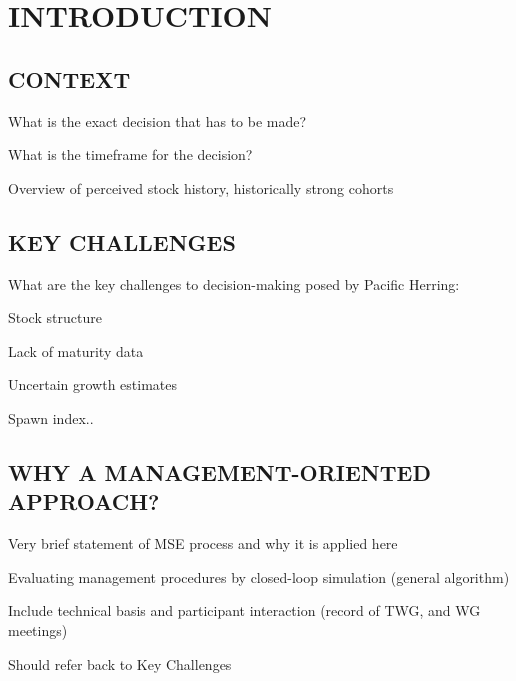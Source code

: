 \documentclass[11pt]{book}\usepackage[]{graphicx}\usepackage[]{color}
\begin{document}

\newcommand{\fishName}{Pacific Herring}
\newcommand{\scienceName}{\emph{Clupea pallasii}}

\frontmatter


\section{INTRODUCTION}

\subsection{CONTEXT}

\begin{resdoclist}
\item What is the exact decision that has to be made?
\item What is the timeframe for the decision?
\item Overview of perceived stock history, historically strong cohorts
\end{resdoclist}

\subsection{KEY CHALLENGES}

What are the key challenges to decision-making posed by \fishName{}:

\begin{resdoclist}
\item Stock structure
\item Lack of maturity data
\item Uncertain growth estimates
\item Spawn index..
\end{resdoclist}

\subsection{WHY A MANAGEMENT-ORIENTED APPROACH?}

\begin{resdoclist}
\item Very brief statement of MSE process and why it is applied here
\item Evaluating management procedures by closed-loop simulation (general algorithm)
\item Include technical basis and participant interaction (record of TWG, and WG meetings)
\item Should refer back to Key Challenges
\end{resdoclist}
\end{document}
